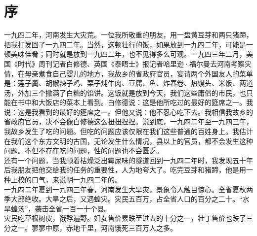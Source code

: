 \fancyhead[RO]{\thepage} %
\fancyhead[LE]{\thepage} %
\fancyfoot[LE,RO]{}
\fancyfoot[LO,CE]{}
\fancyfoot[CO,RE]{}
\chapter*{序}
一九四二年，河南发生大灾荒。一位我所敬重的朋友，用一盘黄豆芽和两只猪蹄，把我打发回了一九四二年。当然，这顿壮行的饭，如果放到一九四二年，可能是一顿美味佳肴；同时就是放到一九四二年，也不见得多么可观。一九四三年二月，美国《时代》周刊记者白修德、英国《泰晤士》报记者哈里逊·福尔曼去河南考察灾情，在母亲煮食自己婴儿的地方，我故乡的省政府官员，宴请两个外国友人的菜单是：莲子羹、胡椒辣子鸡、栗子炖牛肉、豆腐、鱼、炸春卷、热馒头、米饭、两道汤，外加三个撒满了白糖的馅饼。这饭就是放到今天，我们这些庸俗的市民，也只能在书中和大饭店的菜本上看到。白修德说：这是他所吃过的最好的筵席之一。我说：这是我看到的最好的筵席之一。但他又说：他不忍心吃下去。我相信我故乡的省政府官员，决不会像白修德这么扭扭捏捏。说到底，一九四二年至一九四三年，我故乡发生了吃的问题。但吃的问题应该仅限在我们这些普通的百姓身上。我估计在我们这个东方文明的古国，无论发生什么情况，县以上的官员，都不会发生这种问题。不但不存在吃的问题，性的问题也不会匮乏。\\

还有一个问题，当我顺着枯燥泛出霉尿味的隧道回到一九四二年时，我发现五十年后我朋友把他交给我的任务的重要性，人为地夸大了。吃完豆芽和猪蹄，他是用一种上校的口气，来说明一九四二年的。\\

一九四二年夏到一九四三年春，河南发生大旱灾，景象令人触目惊心。全省夏秋两季大部绝收。大旱之后，又遇蝗灾。灾民五百万，占全省人口的百分之二十。“水旱蝗汤”，袭击全省一百一十个县。\\

灾民吃草根树皮，饿殍遍野。妇女售价累跌至过去的十分之一，壮丁售价也跌了三分之一。寥寥中原，赤地千里，河南饿死三百万人之多。\\

